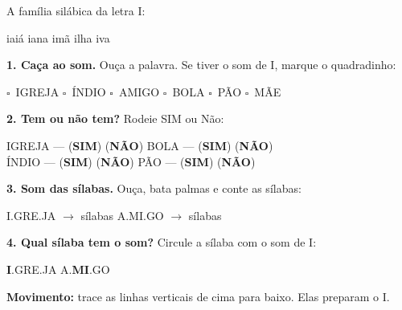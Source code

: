 
\begin{familiasilabica}
A fam\'ilia sil\'abica da letra I:

\begin{center}
iai\'a \quad iana \quad im\~a \quad ilha \quad iva
\end{center}
\end{familiasilabica}


\begin{somletra}
\textbf{1. Ca\c{c}a ao som.} Ou\c{c}a a palavra. Se tiver o som de I, marque o quadradinho:
\begin{center}
$\square$~IGREJA \quad $\square$~\'INDIO \quad $\square$~AMIGO \quad $\square$~BOLA \quad $\square$~P\~AO \quad $\square$~M\~AE
\end{center}

\textbf{2. Tem ou n\~ao{} tem?} Rodeie SIM ou N\~ao:
\begin{center}
IGREJA --- (\textbf{SIM}) (\textbf{N\~AO}) \quad BOLA --- (\textbf{SIM}) (\textbf{N\~AO}) \\ \'INDIO --- (\textbf{SIM}) (\textbf{N\~AO}) \quad P\~AO --- (\textbf{SIM}) (\textbf{N\~AO})
\end{center}
\end{somletra}

\begin{somsilaba}
\textbf{3. Som das s\'ilabas.} Ou\c{c}a, bata palmas e conte as s\'ilabas:
\begin{center}
I.GRE.JA $\rightarrow$ \underline{\hspace{1cm}} s\'ilabas \quad A.MI.GO $\rightarrow$ \underline{\hspace{1cm}} s\'ilabas
\end{center}

\textbf{4. Qual s\'ilaba tem o som?} Circule a s\'ilaba com o som de I:
\begin{center}
\textbf{I}.GRE.JA \quad A.\textbf{MI}.GO
\end{center}
\end{somsilaba}



\begin{motricidade}
\textbf{Movimento:} trace as linhas verticais de cima para baixo. Elas preparam o I.
\begin{center}
\end{center}
\end{motricidade}

